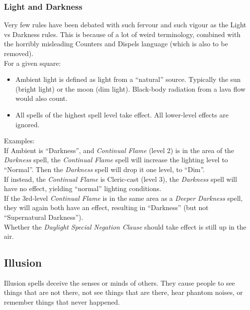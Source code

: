 \subsubsection{Light and Darkness}
\begin{formal}
 Very few rules have been debated with such fervour and such vigour as the Light vs Darkness rules. This is because of a lot of
 weird terminology, combined with the horribly misleading Counters and Dispels language (which is also to be removed).\\
 For a given square:
 \begin{itemize}
  \item Ambient light is defined as light from a ``natural'' source. Typically the sun (bright light) or the moon (dim light). Black-body
      radiation from a lava flow would also count.
  \item All spells of the highest spell level take effect. All lower-level effects are ignored.
 \end{itemize}
 
 Examples: \\
 If Ambient is ``Darkness'', and \textit{Continual Flame} (level 2) is in the area of the \textit{Darkness} spell, the 
 \textit{Continual Flame} spell will increase the lighting level to ``Normal''. Then the \textit{Darkness} spell will drop it one
 level, to ``Dim''. \\
 If instead, the \textit{Continual Flame} is Cleric-cast (level 3), the \textit{Darkness} spell will have no effect, yielding ``normal''
 lighting conditions. \\
 If the 3rd-level \textit{Continual Flame} is in the same area as a \textit{Deeper Darkness} spell, they will again both have an effect,
 resulting in ``Darkness'' (but not ``Supernatural Darkness'').\\
 Whether the \textit{Daylight Special Negation Clause} should take effect is still up in the air.
\end{formal}


				
\subsection{Illusion}

				
Illusion spells deceive the senses or minds of others. They cause people to see things that are not there, not see things that are there, hear phantom noises, or remember things that never happened.
				

